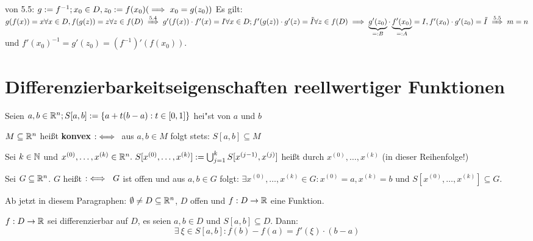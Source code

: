 \documentclass[a4paper,twoside,DIV15,BCOR12mm,chapterprefix=true,headings=twolinechapter]{scrbook}
\begin{document}
\begin{beweis} von 5.5: $g:=f^{-1}; x_0 \in D, z_0:=f(x_0) (\implies x_0 = g(z_0))$
Es gilt: $g(f(x)) = x \forall x \in D, f(g(z)) = z \forall z \in f(D) \folgtnach{5.4} g'(f(x))\cdot f'(x) = I \forall x \in D; f'(g(z))\cdot g'(z) = \tilde{I}
\forall z \in f(D) \folgt \underbrace{g'(z_0)}_{=:B}\cdot \underbrace{f'(x_0)}_{=:A} = I, f'(x_0)\cdot g'(z_0) = \tilde{I} \folgtnach{5.5} m = n$ und $f'(x_0)^{-1} = g'(z_0) = (f^{-1})'(f(x_0))$.
\end{beweis}

\theoremstyle{numberbreak}
\newtheorem{spezialfall}[satz]{Spezialfall}
\chapter{Differenzierbarkeitseigenschaften reellwertiger Funktionen}
\def\grad{\mathop{\rm grad}\nolimits}

\begin{definition}
\begin{liste}
\item Seien $a,b \in \mathbb{R}^n; S[a,b]:=\{a+t(b-a): t\in [0,1]\}$ hei"st
 von $a$ und $b$
\item $M\subseteq \mathbb{R}^n$ heißt \textbf{konvex} $:\iff$\ aus $a,b \in M$ folgt
stets: $S[a,b] \subseteq M$
\item Sei $k \in \mathbb{N}$ und $x^{(0)},\ldots,x^{(k)} \in \MdR^n.\ S[x^{(0)},\ldots,x^{(k)}]:=\bigcup_{j=1}^{k}S[x^{(j-1)}, x^{(j)}]$ heißt  durch $x^{(0)},\ldots,x^{(k)}$ (in dieser Reihenfolge!)
\item Sei $G \subseteq \mathbb{R}^n$. $G$ heißt $:\iff\ G$ ist offen und aus $a,b \in G$ folgt: $\exists x^{(0)},\ldots,x^{(k)} \in G: x^{(0)}=a, x^{(k)}=b$ und $S[x^{(0)},\ldots,x^{(k)}] \subseteq G$.
\end{liste}
\end{definition}

\begin{vereinbarung}
Ab jetzt in diesem Paragraphen: $\emptyset \ne D \subseteq \mathbb{R}^n$, $D$ offen und
$f:D\to \mathbb{R}$ eine Funktion.
\end{vereinbarung}

\begin{satz}
$f:D\to\mathbb{R}$ sei differenzierbar auf $D$, es seien $a,b \in D$ und $S[a,b]\subseteq D$. Dann: $$\exists\ \xi \in S[a,b]: f(b)-f(a)=f'(\xi)\cdot(b-a)$$
$ $%
\end{satz}
\end{document}
